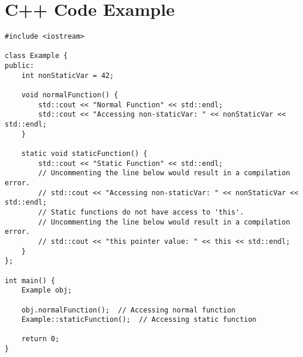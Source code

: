 \documentclass{article}
\begin{document}
\newpage
\section*{C++ Code Example}
\begin{lstlisting}
#include <iostream>

class Example {
public:
    int nonStaticVar = 42;

    void normalFunction() {
        std::cout << "Normal Function" << std::endl;
        std::cout << "Accessing non-staticVar: " << nonStaticVar << std::endl;
    }

    static void staticFunction() {
        std::cout << "Static Function" << std::endl;
        // Uncommenting the line below would result in a compilation error.
        // std::cout << "Accessing non-staticVar: " << nonStaticVar << std::endl;
        // Static functions do not have access to 'this'.
        // Uncommenting the line below would result in a compilation error.
        // std::cout << "this pointer value: " << this << std::endl;
    }
};

int main() {
    Example obj;

    obj.normalFunction();  // Accessing normal function
    Example::staticFunction();  // Accessing static function

    return 0;
}
\end{lstlisting}
\end{document}
